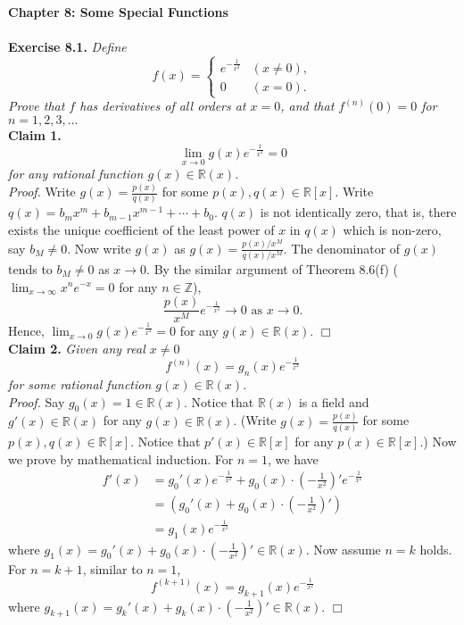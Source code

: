 \documentclass{article}
\begin{document}
\textbf{\Large Chapter 8: Some Special Functions} \\\\






\textbf{Exercise 8.1.}
\emph{Define
\begin{equation*}
  f(x) =
    \begin{cases}
      e^{-\frac{1}{x^2}} & (x \neq 0), \\
      0                  & (x = 0).
    \end{cases}
\end{equation*}
Prove that $f$ has derivatives of all orders at $x = 0$,
and that $f^{(n)}(0) = 0$ for $n = 1, 2, 3, ...$} \\

\textbf{Claim 1.}
\emph{$$\lim_{x \rightarrow 0} g(x) e^{-\frac{1}{x^2}} = 0$$
for any rational function $g(x) \in \mathbb{R}(x)$.} \\

\emph{Proof.}
Write $g(x) = \frac{p(x)}{q(x)}$ for some $p(x), q(x) \in \mathbb{R}[x].$
Write $q(x) = b_m x^m + b_{m - 1} x^{m - 1} + \cdots + b_0$.
$q(x)$ is not identically zero, that is, there exists the unique coefficient
of the least power of $x$ in $q(x)$ which is non-zero, say $b_M \neq 0$.
Now write $g(x)$ as $g(x) = \frac{p(x)/x^M}{q(x)/x^M}$.
The denominator of $g(x)$ tends to $b_M \neq 0$ as $x \rightarrow 0$.
By the similar argument of Theorem 8.6(f)
($\lim_{x \rightarrow \infty} x^n e^{-x} = 0$ for any $n \in \mathbb{Z}$),
$$\frac{p(x)}{x^M} e^{-\frac{1}{x^2}} \rightarrow 0 \text{ as } x \rightarrow 0.$$
Hence, $\lim_{x \rightarrow 0} g(x) e^{-\frac{1}{x^2}} = 0$
for any $g(x) \in \mathbb{R}(x)$.
$\Box$ \\

\textbf{Claim 2.}
\emph{Given any real $x \neq 0$
$$f^{(n)}(x) = g_n(x) e^{-\frac{1}{x^2}}$$
for some rational function $g(x) \in \mathbb{R}(x)$.} \\

\emph{Proof.}
Say $g_0(x) = 1 \in \mathbb{R}(x)$.
Notice that $\mathbb{R}(x)$ is a field and
$g'(x) \in \mathbb{R}(x)$ for any $g(x) \in \mathbb{R}(x)$.
(Write $g(x) = \frac{p(x)}{q(x)}$ for some $p(x), q(x) \in \mathbb{R}[x]$.
Notice that $p'(x) \in \mathbb{R}[x]$ for any $p(x) \in \mathbb{R}[x]$.)
Now we prove by mathematical induction.
For $n = 1$, we have
\begin{align*}
f'(x)
&= g_0'(x) e^{-\frac{1}{x^2}}
+ g_0(x) \cdot \left( -\frac{1}{x^2} \right)' e^{-\frac{1}{x^2}} \\
&= \left( g_0'(x) + g_0(x) \cdot \left( -\frac{1}{x^2} \right)' \right) \\
&= g_1(x) e^{-\frac{1}{x^2}}
\end{align*}
where $g_1(x) = g_0'(x) + g_0(x) \cdot (-\frac{1}{x^2})' \in \mathbb{R}(x)$.
Now assume $n = k$ holds.
For $n = k + 1$, similar to $n = 1$,
$$f^{(k + 1)}(x) = g_{k + 1}(x) e^{-\frac{1}{x^2}}$$
where $g_{k + 1}(x) = g_k'(x) + g_k(x) \cdot (-\frac{1}{x^2})' \in \mathbb{R}(x)$.
$\Box$ \\
\end{document}
